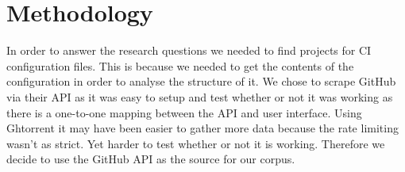 \documentclass[10pt,conference]{IEEEtran}
\begin{document}
\section{Methodology}
\label{methodology}
In order to answer the research questions we needed to find projects for CI configuration files. This is because we needed to get the contents of the configuration in order to analyse the structure of it. We chose to scrape GitHub via their API as it was easy to setup and test whether or not it was working as there is a one-to-one mapping between the API and user interface. Using Ghtorrent \citet{GhTorrent2020} it may have been easier to gather more data because the rate limiting wasn't as strict. Yet harder to test whether or not it is working. Therefore we decide to use the GitHub API as the source for our corpus.
\end{document}
